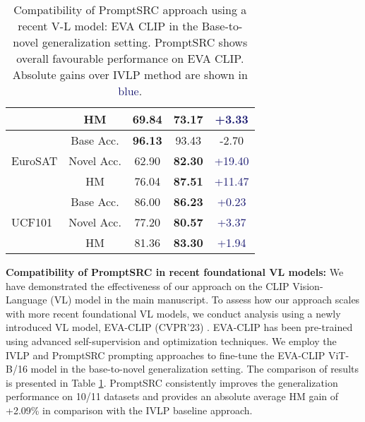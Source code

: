 \documentclass[10pt,twocolumn,letterpaper]{article}
\begin{document}
\begin{table}[t!]
{\begin{tabular}{lc|c c c}
                               & HM            & 69.84 & \textbf{73.17}       & \textcolor{MidnightBlue}{{+3.33}}\\
\midrule
\multirow{3}{*}{EuroSAT}       & Base Acc.     & \textbf{96.13 } &93.43              &  \textcolor{Bittersweet}{{-2.70}}\\
                               & Novel Acc.        & 62.90& \textbf{82.30}           & \textcolor{MidnightBlue}{{+19.40}}\\
                               & HM             & 76.04& \textbf{87.51}   &  \textcolor{MidnightBlue}{{+11.47}}\\
\midrule
\multirow{3}{*}{UCF101}        & Base Acc.      & 86.00  &\textbf{86.23}           & \textcolor{MidnightBlue}{{+0.23}}\\
                               & Novel Acc.     & 77.20  &\textbf{80.57 }          &  \textcolor{MidnightBlue}{{+3.37}}\\
                               & HM           & 81.36 &\textbf{83.30}    & \textcolor{MidnightBlue}{{+1.94}}\\
\bottomrule
\end{tabular}
}\vspace{-0.5em}
    \caption{\small\textnormal{Compatibility of PromptSRC approach using a recent V-L model: EVA CLIP \cite{fang2023eva} in the Base-to-novel generalization setting}. PromptSRC shows overall favourable performance on EVA CLIP. Absolute gains over IVLP method are shown in \textcolor{MidnightBlue}{blue}.}
    \label{tab_appendix:eva_clip_comparison}
\end{table}

 \noindent \textbf{{Compatibility of PromptSRC in recent foundational VL models:}} We have demonstrated the effectiveness of our approach on the CLIP  Vision-Language (VL) model in the main manuscript. To assess how our approach scales with more recent foundational VL models, we conduct analysis using a newly introduced VL model, EVA-CLIP (CVPR'23) \cite{fang2023eva}. EVA-CLIP has been pre-trained using advanced self-supervision and optimization techniques. We employ the IVLP and PromptSRC prompting approaches to fine-tune the EVA-CLIP ViT-B/16 model in the base-to-novel generalization setting. The comparison of results is presented in Table \ref{tab_appendix:eva_clip_comparison}. PromptSRC consistently improves the generalization performance on 10/11 datasets and provides an absolute average HM gain of +2.09\% in comparison with the IVLP baseline approach.
\end{document}

